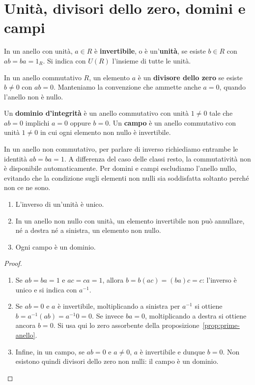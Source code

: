 \section{Unità, divisori dello zero, domini e campi}
\begin{definizione}
In un anello con unità, $a\in R$ è \textbf{invertibile}, o è un'\textbf{unità}, se esiste $b\in R$ con $ab=ba=1_R$. Si indica con $U(R)$ l'insieme di tutte le unità.

In un anello commutativo $R$, un elemento $a$ è un \textbf{divisore dello zero} se esiste $b\ne0$ con $ab=0$. Manteniamo la convenzione che ammette anche $a=0$, quando l'anello non è nullo.

Un \textbf{dominio d'integrità} è un anello commutativo con unità $1\ne0$ tale che $ab=0$ implichi $a=0$ oppure $b=0$. Un \textbf{campo} è un anello commutativo con unità $1\ne0$ in cui ogni elemento non nullo è invertibile.
\end{definizione}

\begin{osservazione}
In un anello non commutativo, per parlare di inverso richiediamo entrambe le identità $ab=ba=1$. A differenza del caso delle classi resto, la commutatività non è disponibile automaticamente. Per domini e campi escludiamo l'anello nullo, evitando che la condizione sugli elementi non nulli sia soddisfatta soltanto perché non ce ne sono.
\end{osservazione}

\begin{proposizione}
\begin{enumerate}[label=\arabic*.]
\item L'inverso di un'unità è unico.
\item In un anello non nullo con unità, un elemento invertibile non può annullare, né a destra né a sinistra, un elemento non nullo.
\item Ogni campo è un dominio.
\end{enumerate}
\end{proposizione}
\begin{proof}
\begin{enumerate}[label=\arabic*.]
\item Se $ab=ba=1$ e $ac=ca=1$, allora $b=b(ac)=(ba)c=c$: l'inverso è unico e si indica con $a^{-1}$.
\item Se $ab=0$ e $a$ è invertibile, moltiplicando a sinistra per $a^{-1}$ si ottiene $b=a^{-1}(ab)=a^{-1}0=0$. Se invece $ba=0$, moltiplicando a destra si ottiene ancora $b=0$. Si usa qui lo zero assorbente della proposizione~\ref{prop:prime-anello}.
\item Infine, in un campo, se $ab=0$ e $a\ne0$, $a$ è invertibile e dunque $b=0$. Non esistono quindi divisori dello zero non nulli: il campo è un dominio.
\end{enumerate}
\end{proof}

